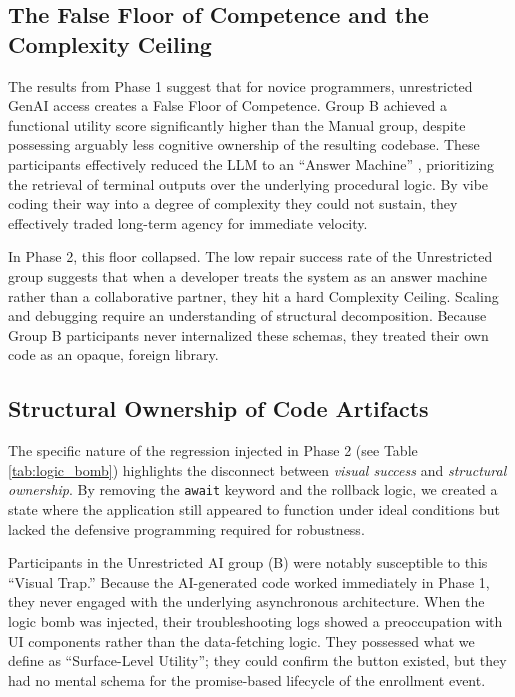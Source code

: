 \documentclass[sigconf]{acmart}
\begin{document}
\subsection{The False Floor of Competence and the Complexity Ceiling}
The results from Phase 1 suggest that for novice programmers, unrestricted GenAI access creates a False Floor of Competence. Group B achieved a functional utility score significantly higher than the Manual group, despite possessing arguably less cognitive ownership of the resulting codebase. These participants effectively reduced the LLM to an ``Answer Machine'' \cite{humanitarians2024answermachine}, prioritizing the retrieval of terminal outputs over the underlying procedural logic. By vibe coding their way into a degree of complexity they could not sustain, they effectively traded long-term agency for immediate velocity.

In Phase 2, this floor collapsed. The low repair success rate of the Unrestricted group suggests that when a developer treats the system as an answer machine rather than a collaborative partner, they hit a hard Complexity Ceiling. Scaling and debugging require an understanding of structural decomposition. Because Group B participants never internalized these schemas, they treated their own code as an opaque, foreign library.

\subsection{Structural Ownership of Code Artifacts}
The specific nature of the regression injected in Phase 2 (see Table \ref{tab:logic_bomb}) highlights the disconnect between \textit{visual success} and \textit{structural ownership}. By removing the \texttt{await} keyword and the rollback logic, we created a state where the application still appeared to function under ideal conditions but lacked the defensive programming required for robustness.

Participants in the Unrestricted AI group (B) were notably susceptible to this ``Visual Trap.'' Because the AI-generated code worked immediately in Phase 1, they never engaged with the underlying asynchronous architecture. When the logic bomb was injected, their troubleshooting logs showed a preoccupation with UI components rather than the data-fetching logic. They possessed what we define as ``Surface-Level Utility''; they could confirm the button existed, but they had no mental schema for the promise-based lifecycle of the enrollment event. 
\end{document}
